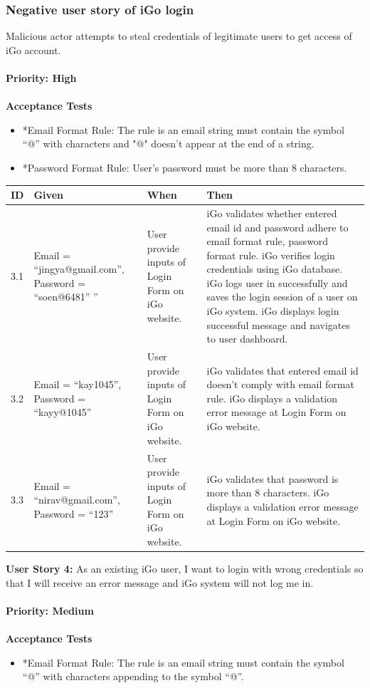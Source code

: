 \documentclass[11pt, english]{report}
\begin{document}
\subsubsection{Negative user story of iGo login}
Malicious actor attempts to steal credentials of legitimate users to get access of iGo account.
\\ \\
\textbf{Priority: High}\\ \\
\textbf{Acceptance Tests}
\begin{itemize}
    \item *Email Format Rule: The rule is an email string must contain the symbol “@” with characters and "@" doesn't appear at the end of a string.
    \item *Password Format Rule: User’s password must be more than 8 characters.
\end{itemize}
\setlength{\tabcolsep}{18pt}
\renewcommand{\arraystretch}{1.5}
\begin{tabular}{ |p{0.5cm}|p{3cm}|p{3.5cm}|p{5cm}| }
\hline
\textbf{ID} & \textbf{Given} & \textbf{When} & \textbf{Then}\\
\hline
3.1 &
Email = “jingya@gmail.com”,
Password = “soen@6481”
” &
User provide inputs of Login Form on iGo website. & iGo validates whether entered email id and password adhere to email format rule, password format rule. 
iGo verifies login credentials using iGo database. 
iGo logs user in successfully and saves the login session of a user on iGo system.
iGo displays login successful message and navigates to user dashboard.
 \\
\hline
3.2 &
Email = “kay1045”,
Password = “kayy@1045”
&
User provide inputs of Login Form on iGo website.
 & 
iGo validates that entered email id doesn't comply with email format rule.
iGo displays a validation error message at Login Form on iGo website.
 \\
\hline
3.3 &
Email = “nirav@gmail.com”,
Password = “123”
&
User provide inputs of Login Form on iGo website.& 
iGo validates that password is more than 8 characters.
iGo displays a validation error message at Login Form on iGo website.
 \\
\hline
\end{tabular}

\vspace*{0.2in}
\textbf{User Story 4\vspace*{0.1in}: }
As an existing iGo user, I want to login with wrong credentials so that I will receive an error message and iGo system will not log me in.
\\ \\
\textbf{Priority: Medium}\\ \\
\textbf{Acceptance Tests}
\begin{itemize}
    \item *Email Format Rule: The rule is an email string must contain the symbol “@” with characters appending to the symbol “@”.
\end{itemize}
\end{document}
